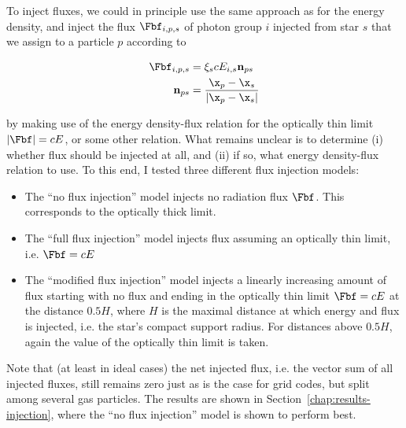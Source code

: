 
To inject fluxes, we could in principle use the same approach as for the energy density, and
inject the flux $\Fbf_{i,p,s}$ of photon group $i$ injected from star $s$ that we assign to a
particle $p$ according to

\begin{align}
	\Fbf_{i,p,s} &= \xi_s c E_{i,s} \mathbf{n}_{ps}  \\
    \mathbf{n}_{ps} &=  \frac{\x_p - \x_s}{|\x_p - \x_s|}
\end{align}

by making use of the energy density-flux relation for the optically thin limit $|\Fbf| = c E$, or
some other relation. What remains unclear is to determine (i) whether flux should be injected at
all, and (ii) if so, what energy density-flux relation to use. To this end, I tested three
different flux injection models:

\begin{itemize}
 \item The ``no flux injection'' model injects no radiation flux $\Fbf$. This corresponds to the
optically thick limit.
 \item The ``full flux injection'' model injects flux assuming an optically thin limit, i.e. $\Fbf
= c E$
 \item The ``modified flux injection'' model injects a linearly increasing amount of flux starting
with no flux and ending in the optically thin limit $\Fbf = c E$ at the distance $0.5H$, where $H$
is the maximal distance at which energy and flux is injected, i.e. the star's compact support
radius. For distances above $0.5H$, again the value of the optically thin limit is taken.
\end{itemize}

Note that (at least in ideal cases) the net injected flux, i.e. the vector sum of all injected
fluxes, still remains zero just as is the case for grid codes, but split among several gas
particles. The results are shown in Section~\ref{chap:results-injection}, where the ``no flux
injection'' model is shown to perform best.
















